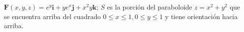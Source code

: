 \item $\mathbf{F}(x,y,z) = e^y\mathbf{i} + ye^x\mathbf{j} + x^2y\mathbf{k}$; $S$ es la porción del paraboloide $z = x^2 + y^2$ que se encuentra arriba del cuadrado $0 \le x \le 1, 0 \le y \le 1$ y tiene orientación hacia arriba.
